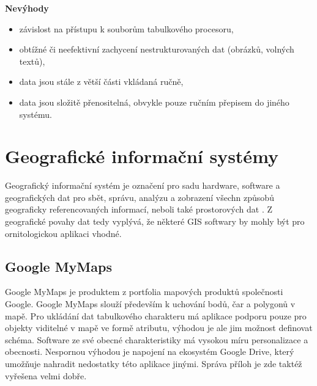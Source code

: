 \textbf{Nevýhody}

\begin{itemize}
	\item závislost na přístupu k souborům tabulkového procesoru,
	\item obtížné či neefektivní zachycení nestrukturovaných dat (obrázků, volných textů),
	\item data jsou stále z větší části vkládaná ručně,
	\item data jsou složitě přenositelná, obvykle pouze ručním přepisem do jiného systému.
\end{itemize}

\section{Geografické informační systémy}

Geografický informační systém je označení pro sadu hardware, software a geografických dat pro sbět, správu, analýzu a zobrazení všechn způsobů geograficky referencovaných informací, neboli také prostorových dat \cite{gartnerGlossary}. Z geografické povahy dat tedy vyplývá, že některé GIS softwary by mohly být pro ornitologickou aplikaci vhodné. 

\subsection{Google MyMaps}

Google MyMaps je produktem z portfolia mapových produktů společnosti Google. Google MyMaps slouží především k uchování bodů, čar a polygonů v mapě. Pro ukládání dat tabulkového charakteru má aplikace podporu pouze pro objekty viditelné v mapě ve formě atributu, výhodou je ale jim možnost definovat schéma. Software ze své obecné charakteristiky má vysokou míru personalizace a obecnosti. Nespornou výhodou je napojení na ekosystém Google Drive, který umožňuje nahradit nedostatky této aplikace jinými. Správa příloh je zde taktéž vyřešena velmi dobře.

